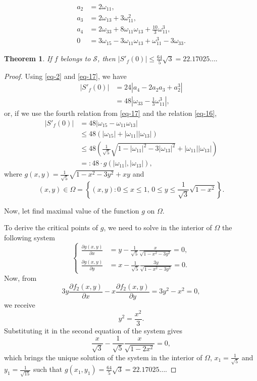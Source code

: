 \documentclass[10pt,a4paper]{amsart}
\newtheorem{thm}{Theorem}
\begin{document}
\begin{equation}\label{eq-17}
\begin{split}
a_{2}&=2\omega _{11},\\
a_{3}&=2\omega_{13}+3\omega_{11}^{2}, \\
a_{4}&=2\omega_{33}+8\omega_{11}\omega_{13}+\frac{10}{3}\omega_{11}^{3},\\
0&=3\omega_{15}-3\omega_{11}\omega_{13}+\omega_{11}^{3}-3\omega_{33}.
\end{split}
\end{equation}

\begin{thm}\label{th5}
If $f$ belongs to $\mathcal{S}$, then $|S'_{f}(0)|\leq \frac{64}{5}\sqrt{3}=22.17025\ldots.$
\end{thm}

\begin{proof}
Using \eqref{eq-2} and \eqref{eq-17}, we have
\[
\begin{split}
|S'_{f}(0)|&=24|a_{4}-2a_{2}a_{3}+a_{2}^{3}|\\
&=48\left|\omega_{33}-\frac{1}{3}\omega_{11}^{3}\right|,
\end{split}
\]
or, if we use the fourth relation from \eqref{eq-17} and the relation \eqref{eq-16},
\[
\begin{split}
|S'_{f}(0)|&=48|\omega_{15}-\omega_{11}\omega_{13}|\\
&\leq48(|\omega_{15}|+|\omega_{11}||\omega_{13}|)\\
&\leq 48\left(\frac{1}{\sqrt{5}}\sqrt{1-|\omega_{11}|^2-3|\omega_{13}|^2}+|\omega_{11}||\omega_{13}|\right)\\
&=:48\cdot g(|\omega_{11}|,|\omega_{13}|),
\end{split}
\]
where
$g(x,y)=\frac{1}{\sqrt{5}}\sqrt{1-x^2-3y^2}+x y$ and
\[ (x,y)\in \Omega = \left\{(x,y) : 0\leq x \leq 1,\, 0\leq y\leq \frac{1}{\sqrt3}\sqrt{1-x^2} \right\}. \]

\medskip

Now, let find maximal value of the function $g$ on $\Omega$.

\medskip

To derive the critical points of $g$, we need to solve in the interior of $\Omega$ the following system
\[
\left\{
\begin{split}
\frac{\partial g(x,y)}{\partial x} &= y-\frac{1}{\sqrt{5} }\frac{x}{\sqrt{1-x^2-3 y^2}} = 0,\\
\frac{\partial g(x,y)}{\partial y} &= x-\frac{1}{\sqrt{5} }\frac{3 y}{\sqrt{1-x^2-3 y^2}} = 0.
\end{split}
\right.
\]
Now, from
\[3y\frac{\partial f_2(x,y)}{\partial x} - x \frac{\partial f_2(x,y)}{\partial y} =
3 y^2-x^2 = 0 , \]
we receive
\[y^2=\frac{x^2}{3}.\]
Substituting it in the second equation of the system gives
\[ \frac{x}{\sqrt{3}}-\frac{1}{\sqrt{5} }\frac{x}{\sqrt{1-2 x^2}} = 0,\]
which brings the unique solution of the system in the interior of $\Omega$, $x_1=\frac{1}{\sqrt5}$ and $y_1=\frac{1}{\sqrt{15}}$ such that $g(x_1,y_1)=\frac{64}{5}\sqrt{3}=22.17025\ldots$.


\end{proof}
\end{document}
